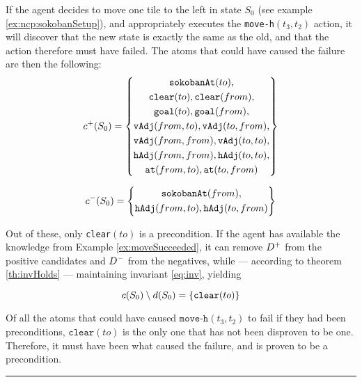 \documentclass[\master/Master.tex]{subfiles}
\begin{document}
\begin{example}
    If the agent decides to move one tile to the left in state $S_0$ (see example \ref{ex:ncp:sokobanSetup}), and appropriately executes the \texttt{move-h}$(t_3, t_2)$ action, it will discover that the new state is exactly the same as the old, and that the action therefore must have failed. The atoms that could have caused the failure are then the following:
    \begin{equation*}
        c^+(S_0) = \left\{
            \begin{gathered}
                \texttt{sokobanAt}(to), \\
                \texttt{clear}(to), \texttt{clear}(from), \\
                \texttt{goal}(to), \texttt{goal}(from), \\
                \texttt{vAdj}(from, to), \texttt{vAdj}(to, from), \\
                \texttt{vAdj}(from, from), \texttt{vAdj}(to, to), \\
                \texttt{hAdj}(from, from), \texttt{hAdj}(to, to), \\
                \texttt{at}(from, to), \texttt{at}(to, from)
            \end{gathered}
        \right\}
    \end{equation*}

    \begin{equation*}
        c^-(S_0) = \left\{
            \begin{gathered}
                \texttt{sokobanAt}(from), \\
                \texttt{hAdj}(from, to), \texttt{hAdj}(to, from)
            \end{gathered}
        \right\}
    \end{equation*}

    Out of these, only \texttt{clear}$(to)$ is a precondition. If the agent has available the knowledge from Example \ref{ex:moveSucceeded}, it can remove $D^+$ from the positive candidates and $D^-$ from the negatives, while --- according to theorem \ref{th:invHolds} --- maintaining invariant \eqref{eq:inv}, yielding

    \begin{equation*}
        c(S_0) \setminus d(S_0) = \left\{ \texttt{clear}(to) \right\}
    \end{equation*}


    Of all the atoms that could have caused $\texttt{move-h}(t_3, t_2)$ to fail if they had been preconditions, $\texttt{clear}(to)$ is the only one that has not been disproven to be one. Therefore, it must have been what caused the failure, and is proven to be a precondition.

    \noindent\rule{\textwidth}{1pt}
\end{example}
\end{document}
